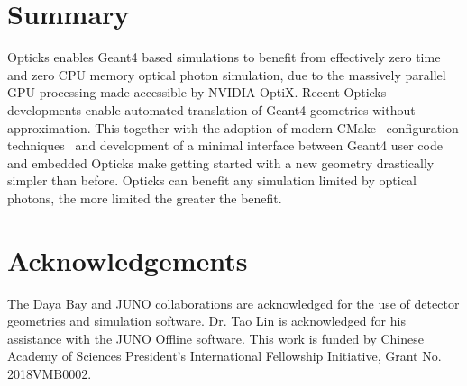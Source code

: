 \documentclass{webofc}
\begin{document}
\section{Summary}
%
Opticks enables Geant4 based simulations to benefit from effectively zero time 
and zero CPU memory optical photon simulation, due to the massively parallel GPU 
processing made accessible by NVIDIA OptiX.
Recent Opticks developments enable automated translation of Geant4 geometries without approximation. 
This together with the adoption of modern CMake~\cite{CMake} configuration techniques~\cite{BCM} and development of a 
minimal interface between Geant4 user code and embedded Opticks make getting started with a new geometry
drastically simpler than before.
Opticks can benefit any simulation limited by optical photons, the more limited the greater the 
benefit.
%
%
\section*{Acknowledgements}
%
The Daya Bay and JUNO collaborations are acknowledged for the use of detector 
geometries and simulation software. Dr. Tao Lin is acknowledged for his assistance with 
the JUNO Offline software. 
This work is funded by Chinese Academy of Sciences President’s International Fellowship Initiative,
Grant No. 2018VMB0002.
%
%
%
\end{document}

